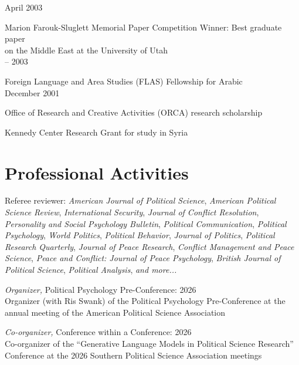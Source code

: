 \documentclass[10pt]{article}
\begin{document}
\raggedleft
April 2003\par
\raggedright 
Marion Farouk-Sluglett Memorial Paper Competition Winner: Best graduate paper\\ on the Middle East at the University of Utah\normalsize\\[3pt]

 -- 2003\par
\raggedright 
Foreign Language and Area Studies (FLAS) Fellowship for Arabic\normalsize\\[3pt]

\raggedleft
December 2001\par
\raggedright 
Office of Research and Creative Activities (ORCA) research scholarship\normalsize\\[3pt]

\par
\raggedright 
Kennedy Center Research Grant for study in Syria\normalsize\ \\[18pt]

	



\section{Professional Activities}

\raggedright
Referee reviewer: \textit{American Journal of Political Science}, \textit{American Political Science Review}, \textit{International Security}, \textit{Journal of Conflict Resolution}, \textit{Personality and Social Psychology Bulletin}, \textit{Political Communication}, \textit{Political Psychology}, \textit{World Politics}, \textit{Political Behavior}, \textit{Journal of Politics}, \textit{Political Research Quarterly}, \textit{Journal of Peace Research}, \textit{Conflict Management and Peace Science}, \textit{Peace and Conflict: Journal of Peace Psychology}, \textit{British Journal of Political Science}, \textit{Political Analysis}, \textit{and more...}\\[5pt]

%
\raggedright
\textit{Organizer,} Political Psychology Pre-Conference: 2026\\
Organizer (with Ris Swank) of the Political Psychology Pre-Conference at the annual meeting of the American Political Science Association\\[5pt]

%
\raggedright
\textit{Co-organizer,} Conference within a Conference: 2026\\
Co-organizer of the ``Generative Language Models in Political Science Research” Conference at the 2026 Southern Political Science Association meetings\\[5pt]
\end{document}
